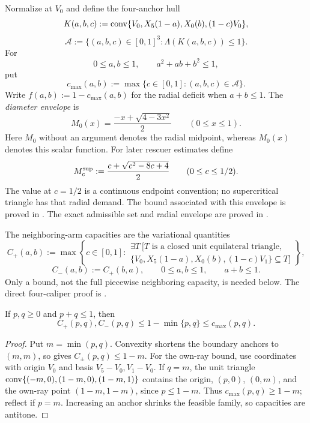Normalize at \(V_0\) and define the four-anchor hull
\[
 K(a,b,c):=
 \mathrm{conv}\{V_0,X_5(1-a),X_0(b),(1-c)V_0\},
\]
\[
 \mathcal A:=
 \{(a,b,c)\in[0,1]^3:\Lambda(K(a,b,c))\le1\}.
\]
For
\[
 0\le a,b\le1,
 \qquad
 a^2+ab+b^2\le1,
\]
put
\[
 c_{\max}(a,b):=
 \max\{c\in[0,1]:(a,b,c)\in\mathcal A\}.
\]
Write $f(a,b):=1-c_{\max}(a,b)$ for the radial deficit when $a+b\le1$.
The \emph{diameter envelope} is
\begin{equation}
 M_0(x)=\frac{-x+\sqrt{4-3x^2}}2\qquad(0\le x\le1).
 \label{eq:diameter-envelope-definition}
\end{equation}
Here $M_0$ without an argument denotes the radial midpoint, whereas
$M_0(x)$ denotes this scalar function. For later rescuer estimates define
\begin{equation}
 M_c^{\rm sup}:=\frac{c+\sqrt{c^2-8c+4}}2\qquad(0\le c\le1/2).
 \label{eq:supercritical-envelope-definition}
\end{equation}
The value at $c=1/2$ is a continuous endpoint convention; no
supercritical triangle has that radial demand. The bound associated with
this envelope is proved in .
The exact admissible set and radial envelope are proved in
.

The neighboring-arm capacities are the variational quantities
\[
 C_+(a,b):=
 \max\left\{c\in[0,1]:
 \begin{array}{l}
 \exists T\ [T\text{ is a closed unit equilateral triangle},\\
 \{V_0,X_5(1-a),X_0(b),(1-c)V_1\}\subseteq T]
 \end{array}\right\},
\]
\[
 C_-(a,b):=C_+(b,a),
 \qquad
 0\le a,b\le1,
 \qquad
 a+b\le1.
\]
Only a bound, not the full piecewise neighboring capacity, is needed below.
The direct four-caliper proof is .

\begin{lemma}
\label{lem:new-common-pair-domination}
\label{lem:appendix-common-pair-domination}
If $p,q\ge0$ and $p+q\le1$, then
\[
 C_+(p,q),C_-(p,q)\le1-\min\{p,q\}\le c_{\max}(p,q).
\]
\end{lemma}
\begin{proof}
Put $m=\min(p,q)$. Convexity shortens the boundary anchors to $(m,m)$,
so  gives $C_\pm(p,q)\le1-m$.
For the own-ray bound, use coordinates with origin $V_0$ and basis
$V_5-V_0,V_1-V_0$. If $q=m$, the unit triangle
$\mathrm{conv}\{(-m,0),(1-m,0),(1-m,1)\}$ contains the origin, $(p,0)$,
$(0,m)$, and the own-ray point $(1-m,1-m)$, since $p\le1-m$.
Thus $c_{\max}(p,q)\ge1-m$; reflect if $p=m$.
Increasing an anchor shrinks the feasible family, so capacities are antitone.
\end{proof}

